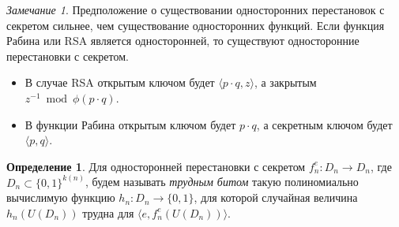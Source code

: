 \documentclass[12pt,a4paper]{article}
\newcommand{\bits}{\{0,1\}}
\theoremstyle{definition}
\newtheorem{definition}{Определение}[section]
\theoremstyle{plain}
\theoremstyle{remark}
\newtheorem{remark}{Замечание}[section]
\begin{document}
\begin{remark}
Предположение о существовании односторонних перестановок
с секретом сильнее, чем существование односторонних
функций. Если функция Рабина или RSA является односторонней,
то существуют односторонние перестановки с секретом.
\begin{itemize}
\item В случае RSA открытым ключом будет $\langle p\cdot q,z\rangle$, а закрытым $z^{-1}\bmod \phi(p\cdot q)$.
\item В  функции Рабина открытым ключом будет $p\cdot q$, а секретным ключом будет $\langle p, q \rangle$.
\end{itemize}
\end{remark}

\begin{definition}
Для односторонней перестановки с секретом $f_n^e: D_n\to D_n$, где $D_n\subset\bits^{k(n)}$,
будем называть \emph{трудным битом} такую полиномиально вычислимую функцию $h_n: D_n\to\bits$,
для которой случайная величина
$h_n(U(D_n))$ трудна для $\langle e, f_n^e(U(D_n))\rangle$. 
\end{definition}
\end{document}
